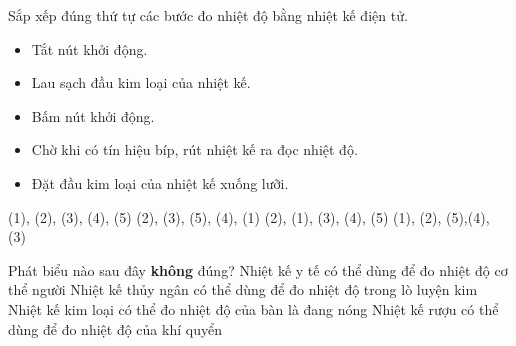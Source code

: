\begin{ex} 
	Sắp xếp đúng thứ tự các bước đo nhiệt độ bằng nhiệt kế điện tử.
	\begin{itemize}
		\item [(1)] Tắt nút khởi động.
		\item [(2)] Lau sạch đầu kim loại của nhiệt kế.
		\item [(3)] Bấm nút khởi động.
		\item [(4)] Chờ khi có tín hiệu bíp, rút nhiệt kế ra đọc nhiệt độ.
		\item [(5)] Đặt đầu kim loại của nhiệt kế xuống lưỡi.
	\end{itemize}
	\choice
	{(1), (2), (3), (4), (5)}
	{\True (2), (3), (5), (4), (1)}
	{(2), (1), (3), (4), (5)}
	{(1), (2), (5),(4), (3)}
	
\end{ex}


\begin{ex} 
	Phát biểu nào sau đây \textbf{không} đúng?
	\choice
	{Nhiệt kế y tế có thể dùng để đo nhiệt độ cơ thể người}
	{\True Nhiệt kế thủy ngân có thể dùng để đo nhiệt độ trong lò luyện kim}
	{Nhiệt kế kim loại có thể đo nhiệt độ của bàn là đang nóng}
	{Nhiệt kế rượu có thể dùng để đo nhiệt độ của khí quyển}
\end{ex}

